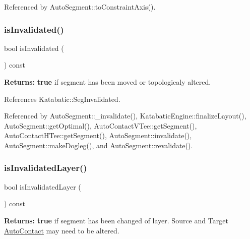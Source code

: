 Referenced by Auto\+Segment\+::to\+Constraint\+Axis().

\mbox{\label{classKatabatic_1_1AutoSegment_ac540608485240ff88970131ebc02c1ab}} 
\subsubsection{\texorpdfstring{is\+Invalidated()}{isInvalidated()}}
{\footnotesize\ttfamily bool is\+Invalidated (\begin{DoxyParamCaption}{ }\end{DoxyParamCaption}) const\hspace{0.3cm}{\ttfamily [inline]}}

{\bfseries Returns\+:} {\bfseries true} if segment has been moved or topologicaly altered. 

References Katabatic\+::\+Seg\+Invalidated.



Referenced by Auto\+Segment\+::\+\_\+invalidate(), Katabatic\+Engine\+::finalize\+Layout(), Auto\+Segment\+::get\+Optimal(), Auto\+Contact\+V\+Tee\+::get\+Segment(), Auto\+Contact\+H\+Tee\+::get\+Segment(), Auto\+Segment\+::invalidate(), Auto\+Segment\+::make\+Dogleg(), and Auto\+Segment\+::revalidate().

\mbox{\label{classKatabatic_1_1AutoSegment_a77b075644356f016105b3050b031a2ec}} 
\subsubsection{\texorpdfstring{is\+Invalidated\+Layer()}{isInvalidatedLayer()}}
{\footnotesize\ttfamily bool is\+Invalidated\+Layer (\begin{DoxyParamCaption}{ }\end{DoxyParamCaption}) const\hspace{0.3cm}{\ttfamily [inline]}}

{\bfseries Returns\+:} {\bfseries true} if segment has been changed of layer. Source and Target \hyperlink{classKatabatic_1_1AutoContact}{Auto\+Contact} may need to be altered. 

